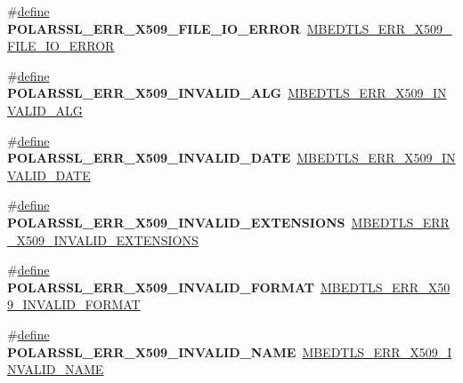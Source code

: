 \begin{DoxyCompactItemize}
\#\hyperlink{structdefine}{define} {\bfseries P\+O\+L\+A\+R\+S\+S\+L\+\_\+\+E\+R\+R\+\_\+\+X509\+\_\+\+F\+I\+L\+E\+\_\+\+I\+O\+\_\+\+E\+R\+R\+OR}~\hyperlink{group__x509__module_gad85d9c7aa5c30b9730297bef3386407c}{M\+B\+E\+D\+T\+L\+S\+\_\+\+E\+R\+R\+\_\+\+X509\+\_\+\+F\+I\+L\+E\+\_\+\+I\+O\+\_\+\+E\+R\+R\+OR}
\item 
\mbox{\label{compat-1_83_8h_ac2a509391d78d52ac972979a8c149aaa}} 
\#\hyperlink{structdefine}{define} {\bfseries P\+O\+L\+A\+R\+S\+S\+L\+\_\+\+E\+R\+R\+\_\+\+X509\+\_\+\+I\+N\+V\+A\+L\+I\+D\+\_\+\+A\+LG}~\hyperlink{group__x509__module_gae16cddbd42e08f6dd093cf4326e59413}{M\+B\+E\+D\+T\+L\+S\+\_\+\+E\+R\+R\+\_\+\+X509\+\_\+\+I\+N\+V\+A\+L\+I\+D\+\_\+\+A\+LG}
\item 
\mbox{\label{compat-1_83_8h_a4c0033b4b5ea413f79b133b9172d967b}} 
\#\hyperlink{structdefine}{define} {\bfseries P\+O\+L\+A\+R\+S\+S\+L\+\_\+\+E\+R\+R\+\_\+\+X509\+\_\+\+I\+N\+V\+A\+L\+I\+D\+\_\+\+D\+A\+TE}~\hyperlink{group__x509__module_gac36bf085ce8f7f57f039bda8828bd824}{M\+B\+E\+D\+T\+L\+S\+\_\+\+E\+R\+R\+\_\+\+X509\+\_\+\+I\+N\+V\+A\+L\+I\+D\+\_\+\+D\+A\+TE}
\item 
\mbox{\label{compat-1_83_8h_aefb797397f3fc132f0d825b77b10ff47}} 
\#\hyperlink{structdefine}{define} {\bfseries P\+O\+L\+A\+R\+S\+S\+L\+\_\+\+E\+R\+R\+\_\+\+X509\+\_\+\+I\+N\+V\+A\+L\+I\+D\+\_\+\+E\+X\+T\+E\+N\+S\+I\+O\+NS}~\hyperlink{group__x509__module_gaa0788dbf0325aea4ab566717514b4422}{M\+B\+E\+D\+T\+L\+S\+\_\+\+E\+R\+R\+\_\+\+X509\+\_\+\+I\+N\+V\+A\+L\+I\+D\+\_\+\+E\+X\+T\+E\+N\+S\+I\+O\+NS}
\item 
\mbox{\label{compat-1_83_8h_abbb0baf5d3e9281b059e3177138f4eaf}} 
\#\hyperlink{structdefine}{define} {\bfseries P\+O\+L\+A\+R\+S\+S\+L\+\_\+\+E\+R\+R\+\_\+\+X509\+\_\+\+I\+N\+V\+A\+L\+I\+D\+\_\+\+F\+O\+R\+M\+AT}~\hyperlink{group__x509__module_ga45b8366804b7e2cbf3e25011f054802c}{M\+B\+E\+D\+T\+L\+S\+\_\+\+E\+R\+R\+\_\+\+X509\+\_\+\+I\+N\+V\+A\+L\+I\+D\+\_\+\+F\+O\+R\+M\+AT}
\item 
\mbox{\label{compat-1_83_8h_a3cf47af101f614432b19192a7a239fe3}} 
\#\hyperlink{structdefine}{define} {\bfseries P\+O\+L\+A\+R\+S\+S\+L\+\_\+\+E\+R\+R\+\_\+\+X509\+\_\+\+I\+N\+V\+A\+L\+I\+D\+\_\+\+N\+A\+ME}~\hyperlink{group__x509__module_ga8f61c2f303bf065af4f783e03f952ede}{M\+B\+E\+D\+T\+L\+S\+\_\+\+E\+R\+R\+\_\+\+X509\+\_\+\+I\+N\+V\+A\+L\+I\+D\+\_\+\+N\+A\+ME}

\end{DoxyCompactItemize}
